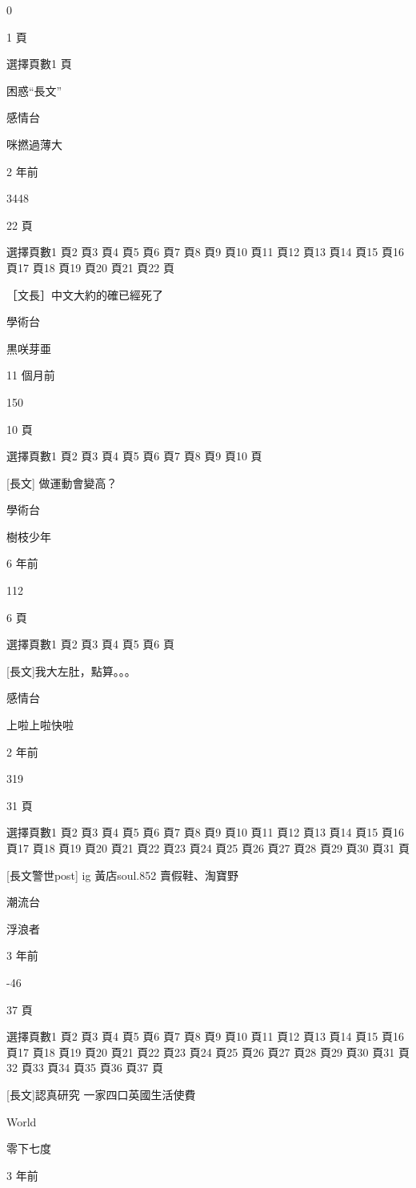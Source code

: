 0

1 頁

選擇頁數1 頁

困惑“長文”

感情台

咪撚過薄大

2 年前

3448

22 頁

選擇頁數1 頁2 頁3 頁4 頁5 頁6 頁7 頁8 頁9 頁10 頁11 頁12 頁13 頁14 頁15 頁16 頁17 頁18 頁19 頁20 頁21 頁22 頁

［文長］中文大約的確已經死了

學術台

黒咲芽亜

11 個月前

150

10 頁

選擇頁數1 頁2 頁3 頁4 頁5 頁6 頁7 頁8 頁9 頁10 頁

[長文] 做運動會變高？

學術台

樹枝少年

6 年前

112

6 頁

選擇頁數1 頁2 頁3 頁4 頁5 頁6 頁

[長文]我大左肚，點算。。。

感情台

上啦上啦快啦

2 年前

319

31 頁

選擇頁數1 頁2 頁3 頁4 頁5 頁6 頁7 頁8 頁9 頁10 頁11 頁12 頁13 頁14 頁15 頁16 頁17 頁18 頁19 頁20 頁21 頁22 頁23 頁24 頁25 頁26 頁27 頁28 頁29 頁30 頁31 頁

[長文警世post] ig 黃店soul.852 賣假鞋、淘寶野

潮流台

浮浪者

3 年前

-46

37 頁

選擇頁數1 頁2 頁3 頁4 頁5 頁6 頁7 頁8 頁9 頁10 頁11 頁12 頁13 頁14 頁15 頁16 頁17 頁18 頁19 頁20 頁21 頁22 頁23 頁24 頁25 頁26 頁27 頁28 頁29 頁30 頁31 頁32 頁33 頁34 頁35 頁36 頁37 頁

[長文]認真研究 一家四口英國生活使費

World

零下七度

3 年前

